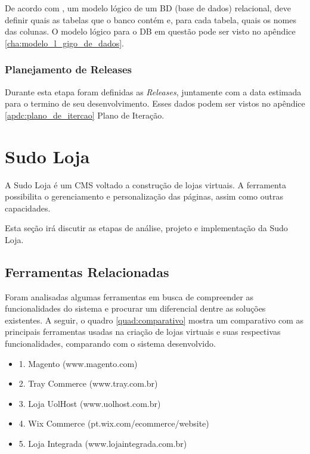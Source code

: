 \documentclass[a4paper,12pt]{monografia}
\begin{document}
De acordo com , um modelo lógico de um BD (base de dados) relacional, deve definir quais as tabelas que o banco contém e, para cada tabela, quais os nomes das colunas. O modelo lógico para o DB em questão pode ser visto no apêndice \ref{cha:modelo_l_gigo_de_dados}.


\subsection{Planejamento de Releases} %
\label{sub:planejamento_de_releases}

Durante esta etapa foram definidas as \textit{Releases}, juntamente com a data estimada para o termino de seu desenvolvimento. Esses dados podem ser vistos no apêndice \ref{apdc:plano_de_itercao} Plano de Iteração.



\chapter{Sudo Loja} %
\label{cha:sudoloja}

A Sudo Loja é um CMS voltado a construção de lojas virtuais. A ferramenta possibilita o gerenciamento e personalização das páginas, assim como outras capacidades.

Esta seção irá discutir as etapas de análise, projeto e implementação da Sudo Loja.

\section{Ferramentas Relacionadas} %
\label{sec:ferramentas_relacionadas}

Foram analisadas algumas ferramentas em busca de compreender as funcionalidades do sistema e procurar um diferencial dentre as soluções existentes. A seguir, o quadro \ref{quad:comparativo} mostra um comparativo com as principais ferramentas usadas na criação de lojas virtuais e suas respectivas funcionalidades, comparando com o sistema desenvolvido.

\begin{itemize}
\item 1. Magento (www.magento.com) \nocite{magento}
\item 2. Tray Commerce (www.tray.com.br) \nocite{tray}
\item 3. Loja UolHost (www.uolhost.com.br) \nocite{uolhost}
\item 4. Wix Commerce (pt.wix.com/ecommerce/website) \nocite{wix}
\item 5. Loja Integrada (www.lojaintegrada.com.br) \nocite{lojaintegrada}

\end{itemize}
\end{document}
